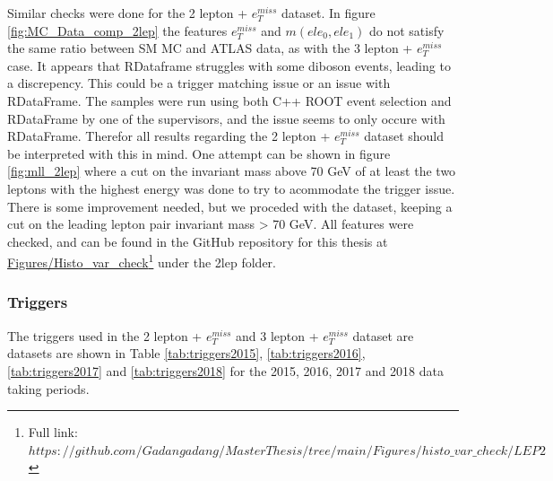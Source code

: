 Similar checks were done for the 2 lepton + $e_T^{miss}$ dataset. In figure \ref{fig:MC_Data_comp_2lep} the features $e_T^{miss}$ and $m(ele_0, ele_1)$ 
do not satisfy the same ratio between SM MC and ATLAS data, as with the 3 lepton + $e_T^{miss}$ case. It appears that RDataframe struggles with some diboson events, 
leading to a discrepency. This could be a trigger matching issue or an issue with RDataFrame. The samples were run using both C++ ROOT event selection and RDataFrame by one of the supervisors, and the 
issue seems to only occure with RDataFrame. Therefor all results regarding the 2 lepton + $e_T^{miss}$ dataset should be interpreted with this in mind. One attempt can be shown in 
figure \ref{fig:mll_2lep} where a cut on the invariant mass above 70 GeV of at least the two leptons with the highest energy was done to try to acommodate the trigger issue. 
There is some improvement needed, but we proceded with the dataset, keeping a cut on the leading lepton pair invariant mass > 70 GeV. All features 
were checked, and can be found in the GitHub repository for this thesis at 
\href{https://github.com/Gadangadang/MasterThesis/tree/main}{Figures/Histo\_var\_check}\footnote{Full link: \href{https://github.com/Gadangadang/MasterThesis/tree/main/Figures/histo_var_check/LEP2}{$https://github.com/Gadangadang/MasterThesis/tree/main/Figures/histo\_var\_check/LEP2$}} under the 2lep folder.



\subsubsection*{Triggers }\label{sec:triggers}

The triggers used in the 2 lepton + $e_T^{miss}$  and 3 lepton + $e_T^{miss}$ dataset are datasets are shown in Table 
\ref{tab:triggers2015}, \ref{tab:triggers2016}, \ref{tab:triggers2017} and \ref{tab:triggers2018} for the 2015, 2016, 2017 and 2018 data taking periods.


